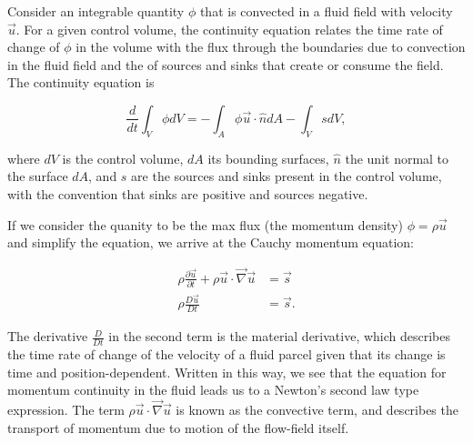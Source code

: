 			Consider an integrable quantity $\phi$ that is convected in a fluid field with velocity $\vec{u}$. For a given control volume, the continuity equation relates the time rate of change of $\phi$ in the volume with the flux through the boundaries due to convection in the fluid field and the of sources and sinks that create or consume the field. The continuity equation is 
			
			\[ \frac{d}{dt}\int_{V}\phi dV=-\int_{A}\phi\vec{u}\cdot\hat{n}dA-\int_{V}s dV, \]
			
			where $dV$ is the control volume, $dA$ its bounding surfaces, $\hat{n}$ the unit normal to the surface $dA$, and $s$ are the sources and sinks present in the control volume, with the convention that sinks are positive and sources negative.
			
			If we consider the quanity to be the max flux (the momentum density) $\phi=\rho \vec{u}$ and simplify the equation, we arrive at the Cauchy momentum equation:
			
			\begin{equation} \label{eq:cauchymomentum}
				\begin{split}
					\rho\frac{\partial\vec{u}}{\partial t}+\rho\vec{u}\cdot\vec{\nabla}\vec{u} &= \vec{s} \\
					\rho\frac{D\vec{u}}{Dt} &= \vec{s}.
				\end{split}
			\end{equation}
			
			The derivative $\frac{D}{Dt}$ in the second term is the material derivative, which describes the time rate of change of the velocity of a fluid parcel given that its change is time and position-dependent. Written in this way, we see that the equation for momentum continuity in the fluid leads us to a Newton's second law type expression. The term $\rho\vec{u}\cdot\vec{\nabla}\vec{u}$ is known as the convective term, and describes the transport of momentum due to motion of the flow-field itself.
			
